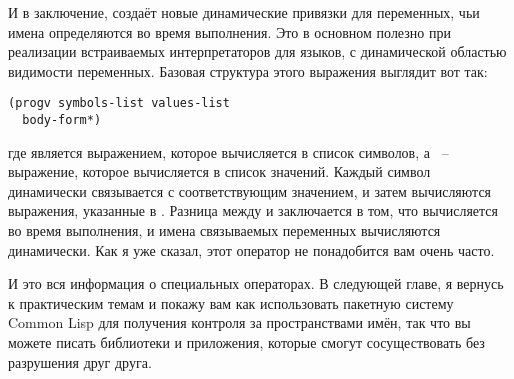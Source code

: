 И в заключение,  создаёт новые динамические привязки для переменных, чьи имена
определяются во время выполнения.  Это в основном полезно при реализации встраиваемых
интерпретаторов для языков, с динамической областью видимости переменных.  Базовая
структура этого выражения выглядит вот так:

\begin{lstlisting}
(progv symbols-list values-list
  body-form*)
\end{lstlisting}

где  является выражением, которое вычисляется в список символов, а
~-- выражение, которое вычисляется в список значений.  Каждый символ
динамически связывается с соответствующим значением, и затем вычисляются выражения,
указанные в .  Разница между  и  заключается в том,
что  вычисляется во время выполнения, и имена связываемых переменных
вычисляются динамически.  Как я уже сказал, этот оператор не понадобится вам очень часто.

И это вся информация о специальных операторах.  В следующей главе, я вернусь к
практическим темам и покажу вам как использовать пакетную систему Common Lisp для
получения контроля за пространствами имён, так что вы можете писать библиотеки и
приложения, которые смогут сосуществовать без разрушения друг друга.

